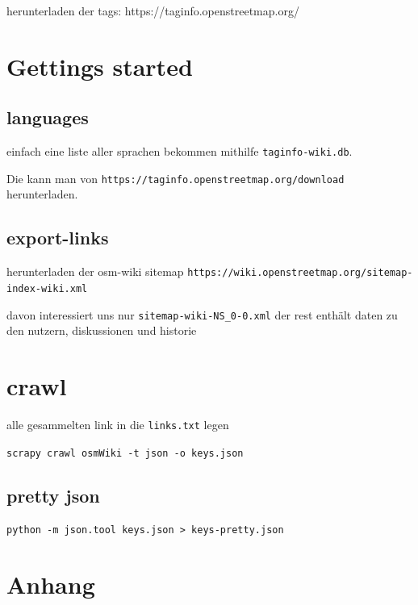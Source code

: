 \documentclass[12pt,pdftex,a4paper]{article}
\begin{document}
herunterladen der tags: https://taginfo.openstreetmap.org/

\section{Gettings started}
\subsection{languages}
einfach eine liste aller sprachen bekommen mithilfe \texttt{taginfo-wiki.db}.

Die kann man von \texttt{https://taginfo.openstreetmap.org/download} herunterladen.

\subsection{export-links}
herunterladen der osm-wiki sitemap
\texttt{https://wiki.openstreetmap.org/sitemap-index-wiki.xml}


davon interessiert uns nur \texttt{sitemap-wiki-NS\_0-0.xml} der rest enthält daten zu den nutzern, diskussionen und historie

\section{crawl}
alle gesammelten link in die \texttt{links.txt} legen

\texttt{scrapy crawl osmWiki -t json -o keys.json}

\subsection{pretty json}
\texttt{python -m json.tool keys.json > keys-pretty.json}


\pagebreak
\section{Anhang}




\end{document}
